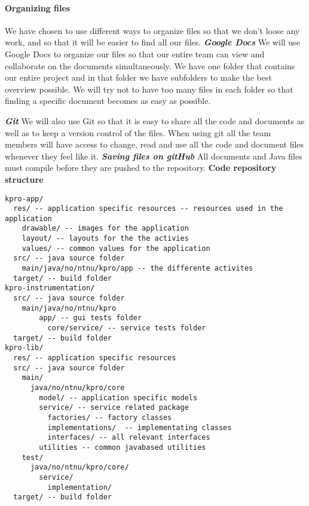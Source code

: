 \paragraph{Organizing files}\hfill
\newline
We have chosen to use different ways to organize files so that we don't loose any work, and so that it will be easier to find all our files.
\newline
\newline
\textit{\textbf{Google Docs}}
\newline
We will use Google Docs to organize our files so that our entire team can view and collaborate on the documents simultaneously. We have one folder that contains our entire project and in that folder we have subfolders to make the best overview possible. We will try not to have too many files in each folder so that finding a specific document becomes as easy as possible.

\newpage

\textit{\textbf{Git}}
\newline
We will also use Git so that it is easy to share all the code and documents as well as to keep a version control of the files. When using \gls{git} all the team members will have access to change, read and use all the code and document files whenever they feel like it.
\newline
\newline
\textit{\textbf{Saving files on gitHub}}
\newline
All documents and Java files must compile before they are pushed to the repository.
\newline
\newline
\textbf{Code repository structure}
\begin{verbatim}
kpro-app/
  res/ -- application specific resources -- resources used in the application
    drawable/ -- images for the application
    layout/ -- layouts for the the activies
    values/ -- common values for the application
  src/ -- java source folder
    main/java/no/ntnu/kpro/app -- the differente activites
  target/ -- build folder
kpro-instrumentation/
  src/ -- java source folder
    main/java/no/ntnu/kpro
	    app/ -- gui tests folder
		  core/service/ -- service tests folder
  target/ -- build folder
kpro-lib/
  res/ -- application specific resources
  src/ -- java source folder
    main/
      java/no/ntnu/kpro/core
        model/ -- application specific models
        service/ -- service related package
          factories/ -- factory classes
          implementations/  -- implementating classes
          interfaces/ -- all relevant interfaces
        utilities -- common javabased utilities
    test/
      java/no/ntnu/kpro/core/
        service/
          implementation/
  target/ -- build folder
\end{verbatim}

